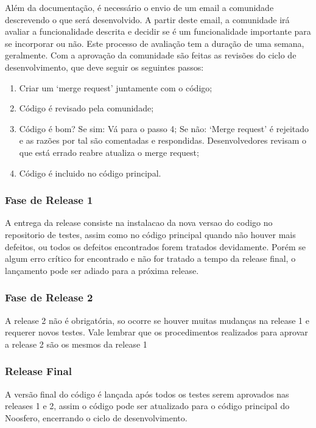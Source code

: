
Além da documentação, é necessário o envio de um email a comunidade descrevendo o 
que será desenvolvido. A partir deste email, a comunidade irá avaliar a funcionalidade 
descrita e decidir se é um funcionalidade importante para se incorporar ou não. 
Este processo de avaliação tem a duração de uma semana, geralmente.
%
Com a aprovação da comunidade são feitas as revisões do ciclo de desenvolvimento, 
que deve seguir os seguintes passos:
%
\begin{enumerate}
\item Criar um ‘merge request’ juntamente com o código;
\item Código é revisado pela comunidade;
\item Código é bom? 
\subitem Se sim:
\subsubitem Vá para o passo 4;
\subitem Se não:
\subsubitem ‘Merge request’ é rejeitado e as razões por tal são comentadas e 
respondidas.
\subsubitem Desenvolvedores revisam o que está errado reabre atualiza o merge 
request;
\item Código é incluido no código principal.
\end{enumerate}
\subsubsection{Fase de Release 1}
%
A entrega da release consiste na instalacao da nova versao do codigo no repositorio 
de testes, assim como no código principal quando não houver mais defeitos, ou todos 
os defeitos encontrados forem tratados devidamente. Porém se algum erro crítico for 
encontrado e não for tratado a tempo da release final, o lançamento pode ser adiado 
para a próxima release.
%
\subsubsection{Fase de Release 2}
%
A release 2 não é obrigatória, so ocorre se houver muitas mudanças na release 1 e 
requerer novos testes. Vale lembrar que os procedimentos realizados para aprovar a 
release 2 são os mesmos da release 1
%
\subsubsection{Release Final}
%
A versão final do código é lançada após todos os testes serem aprovados nas releases 
1 e 2, assim o código pode ser atualizado para o código principal do Noosfero, 
encerrando o ciclo de desenvolvimento.

